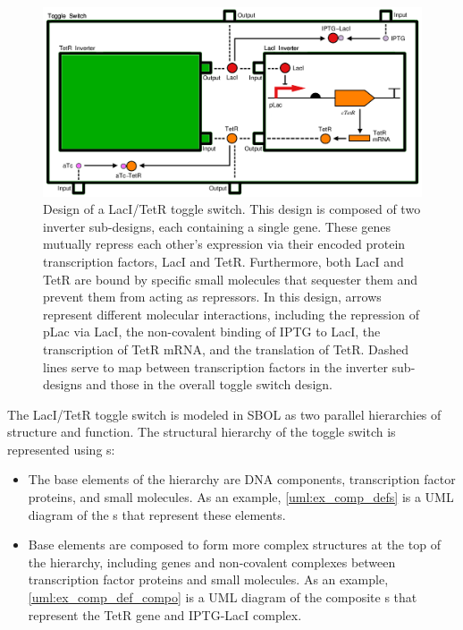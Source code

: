 \begin{figure}[ht]
\begin{center}
\includegraphics[scale=0.4]{images/toggleswitch_modular}
\caption[]{Design of a LacI/TetR toggle switch. This design is composed of two inverter sub-designs, each containing a single gene. These genes mutually repress each other's expression via their encoded protein transcription factors, LacI and TetR. Furthermore, both LacI and TetR are bound by specific small molecules that sequester them and prevent them from acting as repressors. In this design, arrows represent different molecular interactions, including the repression of pLac via LacI, the non-covalent binding of IPTG to LacI, the transcription of TetR mRNA, and the translation of TetR. Dashed lines serve to map between transcription factors in the inverter sub-designs and those in the overall toggle switch design.}
\label{images:toggleswitch_modular}
\end{center}
\end{figure}

The LacI/TetR toggle switch is modeled in SBOL as two parallel hierarchies of structure and function. The structural hierarchy of the toggle switch is represented using s:
\begin{itemize}
\item The base elements of the hierarchy are DNA components, transcription factor proteins, and small molecules. As an example, \ref{uml:ex_comp_defs} is a UML diagram of the s that represent these elements.
\item Base elements are composed to form more complex structures at the top of the hierarchy, including genes and non-covalent complexes between transcription factor proteins and small molecules. As an example, \ref{uml:ex_comp_def_compo} is a UML diagram of the composite s that represent the TetR gene and IPTG-LacI complex.
\end{itemize}

